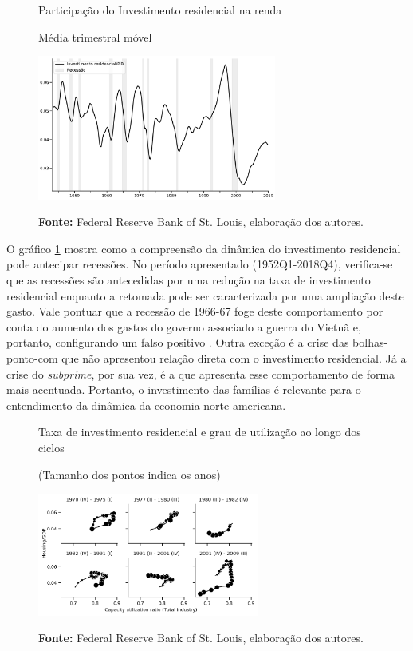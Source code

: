 \begin{figure}[htb]
    \centering
        \caption{Participação do Investimento residencial na renda} 
        \caption*{Média trimestral móvel}
    \includegraphics[width = 0.7\textwidth]{Introducao/InvtResiden_PIB.png}
    \label{Investo_Resid_GDP}
    \caption*{\textbf{Fonte:} Federal Reserve Bank of St. Louis, elaboração dos autores.}
\end{figure} 

O gráfico \ref{Investo_Resid_GDP} mostra como a compreensão da dinâmica do investimento residencial pode antecipar recessões. No período apresentado (1952Q1-2018Q4), verifica-se que as recessões são antecedidas por uma redução na taxa de investimento residencial enquanto a retomada pode ser caracterizada por uma ampliação deste gasto. Vale pontuar que a recessão de 1966-67 foge deste comportamento por conta do aumento dos gastos do governo associado a guerra do Vietnã e, portanto, configurando um falso positivo \cite[p.~20]{leamer_housing_2007}. Outra exceção é a crise das bolhas-ponto-com que não apresentou relação direta com o investimento residencial. Já a crise do \textit{subprime}, por sua vez, é a que apresenta esse comportamento de forma mais acentuada. Portanto, o investimento das famílias é relevante para o entendimento da dinâmica da economia norte-americana.

\begin{figure}[htb]
    \centering
        \caption{Taxa de investimento residencial e grau de utilização ao longo dos ciclos} 
        \caption*{(Tamanho dos pontos indica os anos)}
    \includegraphics[width = 0.65\textwidth]{Introducao/Empiria_AKB.png}
    \label{Investo_Resid}
    \caption*{\textbf{Fonte:} Federal Reserve Bank of St. Louis, elaboração dos autores.}
\end{figure}

